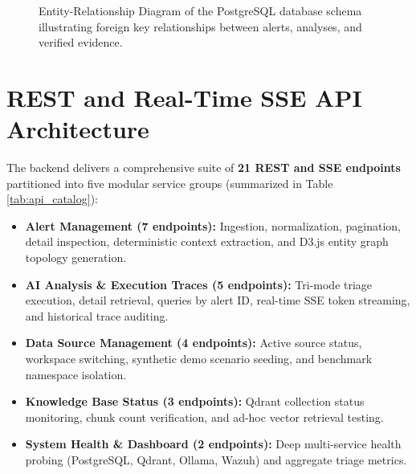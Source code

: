 \begin{figure}[!htbp]
\caption{Entity-Relationship Diagram of the PostgreSQL database schema illustrating foreign key relationships between alerts, analyses, and verified evidence.}
\label{fig:erd_diagram}
\end{figure}

\section{REST and Real-Time SSE API Architecture}
\label{sec:api_architecture}
The backend delivers a comprehensive suite of \textbf{21 REST and SSE endpoints} partitioned into five modular service groups (summarized in Table \ref{tab:api_catalog}):
\begin{itemize}[itemsep=1pt,topsep=2pt]
  \item \textbf{Alert Management (7 endpoints):} Ingestion, normalization, pagination, detail inspection, deterministic context extraction, and D3.js entity graph topology generation.
  \item \textbf{AI Analysis \& Execution Traces (5 endpoints):} Tri-mode triage execution, detail retrieval, queries by alert ID, real-time SSE token streaming, and historical trace auditing.
  \item \textbf{Data Source Management (4 endpoints):} Active source status, workspace switching, synthetic demo scenario seeding, and benchmark namespace isolation.
  \item \textbf{Knowledge Base Status (3 endpoints):} Qdrant collection status monitoring, chunk count verification, and ad-hoc vector retrieval testing.
  \item \textbf{System Health \& Dashboard (2 endpoints):} Deep multi-service health probing (PostgreSQL, Qdrant, Ollama, Wazuh) and aggregate triage metrics.
\end{itemize}

